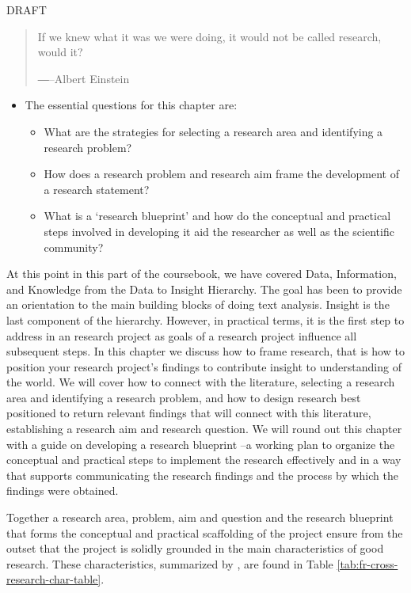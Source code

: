 \documentclass[
]{article}
\providecommand{\tightlist}{%
  \setlength{\itemsep}{0pt}\setlength{\parskip}{0pt}}
\newenvironment{rmdblock}[1]
  {\begin{shaded*}
  \begin{itemize}
  \renewcommand{\labelitemi}{
    \raisebox{-.5\height}[0pt][0pt]{
      {\setkeys{Gin}{width=2em,keepaspectratio}\texttt{[image: assets/images/\#1]}}
    }
  }
  \item
  }
  {
  \end{itemize}
  \end{shaded*}
  }
\newenvironment{rmdkey}
  {\begin{rmdblock}{key}}
  {\end{rmdblock}}
\begin{document}
DRAFT

\begin{quote}
If we knew what it was we were doing, it would not be called research, would it?

―--Albert Einstein
\end{quote}

\begin{rmdkey}
The essential questions for this chapter are:

\begin{itemize}
\tightlist
\item
  What are the strategies for selecting a research area and identifying
  a research problem?
\item
  How does a research problem and research aim frame the development of
  a research statement?
\item
  What is a `research blueprint' and how do the conceptual and practical
  steps involved in developing it aid the researcher as well as the
  scientific community?
\end{itemize}
\end{rmdkey}

At this point in this part of the coursebook, we have covered Data, Information, and Knowledge from the Data to Insight Hierarchy. The goal has been to provide an orientation to the main building blocks of doing text analysis. Insight is the last component of the hierarchy. However, in practical terms, it is the first step to address in an research project as goals of a research project influence all subsequent steps. In this chapter we discuss how to frame research, that is how to position your research project's findings to contribute insight to understanding of the world. We will cover how to connect with the literature, selecting a research area and identifying a research problem, and how to design research best positioned to return relevant findings that will connect with this literature, establishing a research aim and research question. We will round out this chapter with a guide on developing a research blueprint --a working plan to organize the conceptual and practical steps to implement the research effectively and in a way that supports communicating the research findings and the process by which the findings were obtained.

Together a research area, problem, aim and question and the research blueprint that forms the conceptual and practical scaffolding of the project ensure from the outset that the project is solidly grounded in the main characteristics of good research. These characteristics, summarized by \citet{Cross2006}, are found in Table \ref{tab:fr-cross-research-char-table}.
\end{document}
